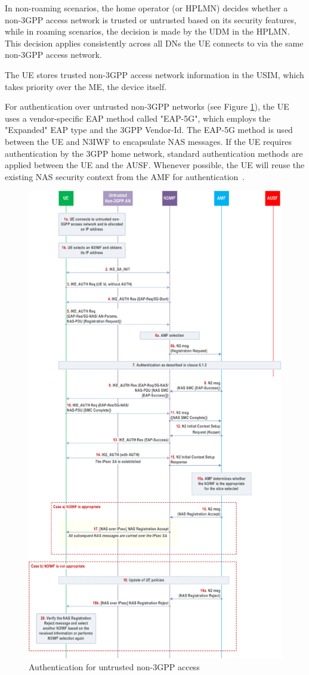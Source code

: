 In non-roaming scenarios, the home operator (or \ac{HPLMN}) decides whether a non-\ac{3GPP} access network is trusted or untrusted based on its security features, while in roaming scenarios, the decision is made by the \ac{UDM} in the \ac{HPLMN}. This decision applies consistently across all \acp{DN} the \ac{UE} connects to via the same non-\ac{3GPP} access network.

The \ac{UE} stores trusted non-\ac{3GPP} access network information in the \ac{USIM}, which takes priority over the \ac{ME}, the device itself.

For authentication over untrusted non-\ac{3GPP} networks (see Figure \ref{fig:Authentication for untrusted non-3GPP access}), the \ac{UE} uses a vendor-specific \ac{EAP} method called "EAP-5G", which employs the "Expanded" \ac{EAP} type and the \ac{3GPP} Vendor-Id. The \ac{EAP-5G} method is used between the \ac{UE} and \ac{N3IWF} to encapsulate \ac{NAS} messages. If the \ac{UE} requires authentication by the \ac{3GPP} home network, standard authentication methods are applied between the \ac{UE} and the \ac{AUSF}. Whenever possible, the \ac{UE} will reuse the existing \ac{NAS} security context from the \ac{AMF} for authentication~\cite{33.501-p128}.

\begin{figure}
    \centering
    \includegraphics[width=0.75\linewidth]{figs/Authentication for untrusted non-3GPP access.png}
    \caption{Authentication for untrusted non-\ac{3GPP} access}
    \label{fig:Authentication for untrusted non-3GPP access}
\end{figure}

